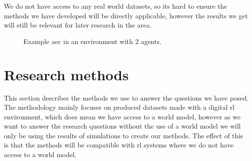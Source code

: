 \documentclass[UKenglish]{uiomasterthesis}
\begin{document}
We do not have access to any real world datasets, so its hard to ensure the methods we have developed will be directly applicable, however the results we get will still be relevant for later research in the area.
\begin{figure}
\begin{center}


\caption{Example \ac{aec} in an environment with 2 agents.}
\label{fig:aec}
\end{center}
\end{figure}

\section{Research methods}
\label{sec:research}
This section describes the methods we use to answer the questions we have posed. The methodology mainly focuses on produced datasets made with a digital \ac{rl} environment, which does mean we have access to a world model, however as we want to answer the research questions without the use of a world model we will only be using the results of simulations to create our methods. The effect of this is that the methods will be compatible with \ac{rl} systems where we do not have access to a world model.
\end{document}

